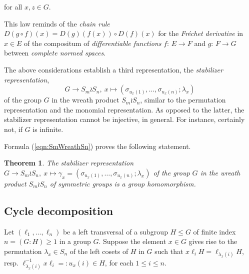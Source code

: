 \documentclass{amsart}
\newtheorem{theorem}{Theorem}[section]
\theoremstyle{definition}
\numberwithin{equation}{section}
\begin{document}
\noindent
for all \(x,z\in G\).

This law reminds of the \textit{chain rule}
\(D(g\circ f)(x)=D(g)(f(x))\circ D(f)(x)\)
for the \textit{Fr\'echet derivative} in \(x\in E\) of the compositum of \textit{differentiable functions}
\(f:\,E\to F\) and \(g:\,F\to G\) between \textit{complete normed spaces}.


The above considerations establish a third representation, the \textit{stabilizer representation},
\[G\to S_m\wr S_n,\ x\mapsto(\sigma_{u_x(1)},\ldots,\sigma_{u_x(n)};\lambda_x)\]
of the group \(G\) in the wreath product \(S_m\wr S_n\),
similar to the permutation representation and the monomial representation.
As opposed to the latter, the stabilizer representation cannot be injective, in general.
For instance, certainly not, if \(G\) is infinite.

Formula
(\ref{eqn:SmWreathSn})
proves the following statement.

\begin{theorem}
\label{thm:StabilizerRep}
The stabilizer representation
\(G\to S_m\wr S_n,\ x\mapsto\gamma_{x}=(\sigma_{u_x(1)},\ldots,\sigma_{u_x(n)};\lambda_x)\)
of the group \(G\) in the wreath product \(S_m\wr S_n\) of symmetric groups
is a group homomorphism.
\end{theorem}



\subsection{Cycle decomposition}
\label{ss:CycDec}

Let \((\ell_1,\ldots,\ell_n)\) be a left transversal of a subgroup \(H\le G\) of finite index \(n=(G:H)\ge 1\) in a group \(G\).
Suppose the element \(x\in G\) gives rise to the permutation \(\lambda_x\in S_n\) of the left cosets of \(H\) in \(G\) such that
\(x\ell_iH=\ell_{\lambda_x(i)}H\), resp. \(\ell_{\lambda_x(i)}^{-1}x\ell_i=:u_x(i)\in H\), for each \(1\le i\le n\).
\end{document}
